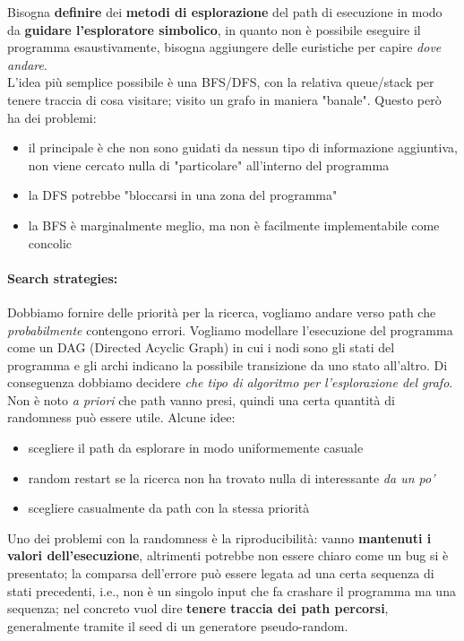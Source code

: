 Bisogna \textbf{definire} dei \textbf{metodi di esplorazione} del path di esecuzione in modo da \textbf{guidare l'esploratore simbolico}, in quanto non è possibile eseguire il programma esaustivamente, bisogna aggiungere delle euristiche per capire \textit{dove andare}. \\

L'idea più semplice possibile è una BFS/DFS, con la relativa queue/stack per tenere traccia di cosa visitare; visito un grafo in maniera "banale". Questo però ha dei problemi: 
\begin{itemize}
	\item il principale è che non sono guidati da nessun tipo di informazione aggiuntiva, non viene cercato nulla di "particolare" all'interno del programma
	\item la DFS potrebbe "bloccarsi in una zona del programma"
	\item la BFS è marginalmente meglio, ma non è facilmente implementabile come concolic
\end{itemize}

\paragraph{Search strategies:} Dobbiamo fornire delle priorità per la ricerca, vogliamo andare verso path che \textit{probabilmente} contengono errori. Vogliamo modellare l'esecuzione del programma come un DAG (Directed Acyclic Graph) in cui i nodi sono gli stati del programma e gli archi indicano la possibile transizione da uno stato all'altro. Di conseguenza dobbiamo decidere \textit{che tipo di algoritmo per l'esplorazione del grafo}.\\

Non è noto \textit{a priori} che path vanno presi, quindi una certa quantità di randomness può essere utile. Alcune idee:
\begin{itemize}
	\item scegliere il path da esplorare in modo uniformemente casuale
	\item random restart se la ricerca non ha trovato nulla di interessante \textit{da un po'}
	\item scegliere casualmente da path con la stessa priorità
\end{itemize}

Uno dei problemi con la randomness è la riproducibilità: vanno \textbf{mantenuti i valori dell'esecuzione}, altrimenti potrebbe non essere chiaro come un bug si è presentato; la comparsa dell'errore può essere legata ad una certa sequenza di stati precedenti, i.e., non è un singolo input che fa crashare il programma ma una sequenza; nel concreto vuol dire \textbf{tenere traccia dei path percorsi}, generalmente tramite il seed di  un generatore pseudo-random.\\

